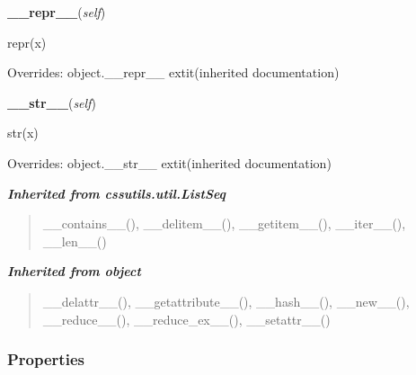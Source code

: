     \vspace{0.5ex}

\hspace{.8\funcindent}\begin{boxedminipage}{\funcwidth}

    \raggedright \textbf{\_\_repr\_\_}(\textit{self})

\setlength{\parskip}{2ex}
    repr(x)

\setlength{\parskip}{1ex}
      Overrides: object.\_\_repr\_\_ 	extit{(inherited documentation)}

    \end{boxedminipage}

    \vspace{0.5ex}

\hspace{.8\funcindent}\begin{boxedminipage}{\funcwidth}

    \raggedright \textbf{\_\_str\_\_}(\textit{self})

\setlength{\parskip}{2ex}
    str(x)

\setlength{\parskip}{1ex}
      Overrides: object.\_\_str\_\_ 	extit{(inherited documentation)}

    \end{boxedminipage}


\large{\textbf{\textit{Inherited from cssutils.util.ListSeq}}}

\begin{quote}
\_\_contains\_\_(), \_\_delitem\_\_(), \_\_getitem\_\_(), \_\_iter\_\_(), \_\_len\_\_()
\end{quote}

\large{\textbf{\textit{Inherited from object}}}

\begin{quote}
\_\_delattr\_\_(), \_\_getattribute\_\_(), \_\_hash\_\_(), \_\_new\_\_(), \_\_reduce\_\_(), \_\_reduce\_ex\_\_(), \_\_setattr\_\_()
\end{quote}


  \subsubsection{Properties}

